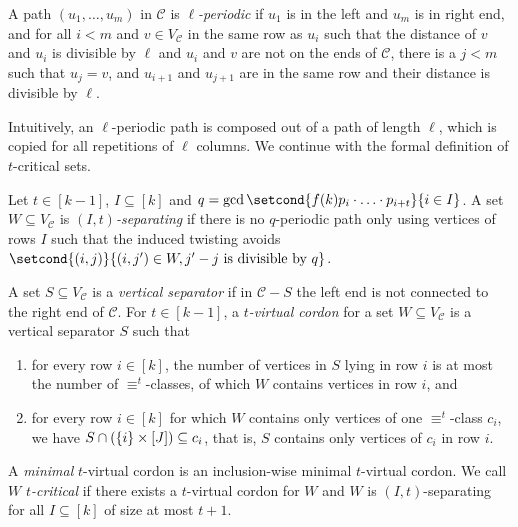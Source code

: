 \documentclass[a4paper,english, thm-restate]{lipics-v2021}
\newcommand{\defining}[1]{\emph{#1}}
\DeclarePairedDelimiter\set{\lbrace}{\rbrace}
\newcommand{\comp}{\equiv}
\newcommand{\grid}{\mathcal{C}}
\newcommand{\vertexC}{V_{\mathcal{C}}}
\newcommand{\confORfull}[2]{#1}
\begin{document}
	
	\begin{definition}
		A path $(u_1,\dots,u_m)$ in $\grid$ is \defining{$\ell$-periodic} if $u_1$ is in the left and $u_m$ is in right end, and for
		all $i < m$ and $v \in \vertexC$ in the same row as $u_i$ such that 
		the distance of $v$ and $u_i$ is divisible by $\ell$
		and $u_i$ and $v$ are not on the ends of $\grid$,
		there is a $j < m$ such that $u_j = v$, and
		$u_{i+1}$ and $u_{j+1}$ are in the same row
		and their distance is divisible by $\ell$.
	\end{definition}
	
	\noindent Intuitively, an $\ell$-periodic path is composed out of a path of length $\ell$,
	which is copied for all repetitions of $\ell$ columns.
	We continue with the formal definition of $t$-critical sets.

	
	\begin{definition}
		Let $t \in [k-1]$, $I \subseteq [k]$ and $q = \gcd \setcond{f(k)p_i\cdot \ldots \cdot  p_{i+t}}{i \in I}$. A set $W\subseteq \vertexC$ is \defining{$(I,t)$-separating}
		if there is no $q$-periodic path only using vertices of rows $I$ such that the induced twisting avoids 
		$\setcond{(i,j)}{(i,j') \in W, j'-j \text{ is divisible by }q}$.
	\end{definition}
	
	
	\begin{definition}
		A set $S \subseteq \vertexC$ 
		is a \defining{vertical separator}
		if in  $\grid-S$ 
		the left end is not connected to the right end of $\grid$.
		For $t \in [k-1]$, a \defining{$t$-virtual cordon} for a set  $W \subseteq \vertexC$ is a vertical separator $S$ such that
		\begin{enumerate}
			\item for every row $i \in [k]$, 
			the number of vertices in $S$ lying in row $i$
			is at most the number of $\comp^t$-classes,
			of which $W$ contains vertices in row $i$, and
			\item for every row $i \in [k]$ for which $W$ contains only vertices of one $\comp^t$-class $c_i$,
			we have $S\cap (\set{i}\times [J]) \subseteq c_i$,
			that is, $S$ contains only vertices of $c_i$ in row $i$.
		\end{enumerate}
		A \defining{minimal} $t$-virtual cordon is an inclusion-wise minimal $t$-virtual cordon.
		We call \confORfull{}{the set} $W$ \defining{$t$\nobreakdash-critical} if there exists a $t$-virtual cordon for $W$ and $W$ is $(I,t)$-separating for all $I \subseteq [k]$ of size at most $t+1$.
	\end{definition}
	
\end{document}
